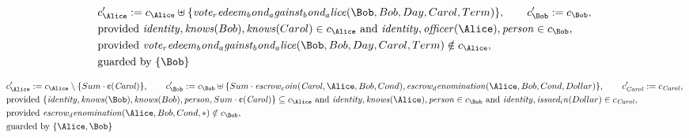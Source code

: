 \begin{align*}
&
c'_
{
\Alice
}
 := 
c_
{
\Alice
}
 \uplus 
\{
\mathit{
vote_redeem_bond_against_bond_alice
}
(
\Bob
,
Bob
,
Day
,
Carol
,
Term
)
\}
, \qquad 
c'_
{
\Bob
}
 := 
c_
{
\Bob
}
,\\
&
\text{provided } 
\mathit{
identity
}
,
\mathit{
knows
}
(
Bob
)
,
\mathit{
knows
}
(
Carol
)
 \in c_
{
\Alice
}
 \text{ and } 
\mathit{
identity
}
,
\mathit{
officer
}
(
\Alice
)
,
\mathit{
person
}
 \in c_
{
\Bob
}
,\\
&
\text{provided } 
\mathit{
vote_redeem_bond_against_bond_alice
}
(
\Bob
,
Bob
,
Day
,
Carol
,
Term
)
 \notin c_
{
\Alice
}
,\\
&
\text{guarded by } \{
\Bob
\}
\end{align*}

\begin{align*}
&
c'_
{
\Alice
}
 := 
c_
{
\Alice
}
 \setminus 
\{
Sum
\cdot
\text{\textcent}
(
\mathit{Carol}
)
\}
, \qquad 
c'_
{
\Bob
}
 := 
c_
{
\Bob
}
 \uplus 
\{
Sum
\cdot
\mathit{
escrow_coin
}
(
\mathit{Carol}
,
\Alice
,
Bob
,
Cond
)
,
\mathit{
escrow_denomination
}
(
\Alice
,
Bob
,
Cond
,
Dollar
)
\}
, \qquad 
c'_
{
\mathit{Carol}
}
 := 
c_
{
\mathit{Carol}
}
,\\
&
\text{provided } 
\{
\mathit{
identity
}
,
\mathit{
knows
}
(
\Bob
)
,
\mathit{
knows
}
(
Bob
)
,
\mathit{
person
}
,
Sum
\cdot
\text{\textcent}
(
\mathit{Carol}
)
\}
 \subseteq c_
{
\Alice
}
 \text{ and } 
\mathit{
identity
}
,
\mathit{
knows
}
(
\Alice
)
,
\mathit{
person
}
 \in c_
{
\Bob
}
 \text{ and } 
\mathit{
identity
}
,
\mathit{
issued_in
}
(
Dollar
)
 \in c_
{
\mathit{Carol}
}
,\\
&
\text{provided } 
\mathit{
escrow_denomination
}
(
\Alice
,
Bob
,
Cond
,
\ast
)
 \notin c_
{
\Bob
}
,\\
&
\text{guarded by } \{
\Alice
,
\Bob
\}
\end{align*}

